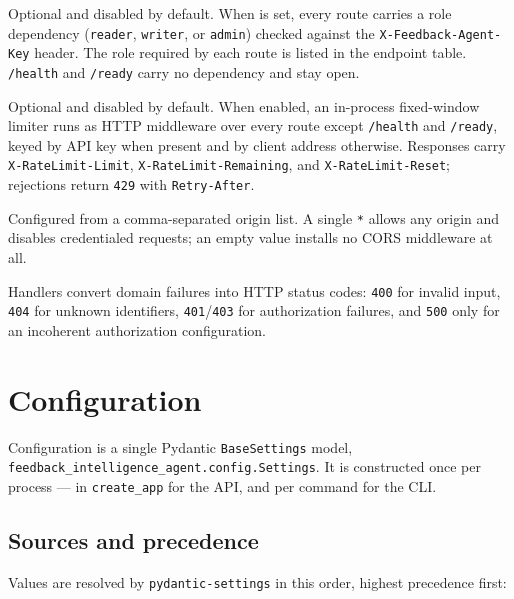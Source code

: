 \begin{description}[nosep]
  \item[Authorization] Optional and disabled by default. When
     is set, every route carries a
    role dependency (\texttt{reader}, \texttt{writer}, or \texttt{admin})
    checked against the \texttt{X-Feedback-Agent-Key} header. The role required
    by each route is listed in the endpoint table. \texttt{/health} and
    \texttt{/ready} carry no dependency and stay open.
  \item[Rate limiting] Optional and disabled by default. When enabled, an
    in-process fixed-window limiter runs as HTTP middleware over every route
    except \texttt{/health} and \texttt{/ready}, keyed by API key when present
    and by client address otherwise. Responses carry
    \texttt{X-RateLimit-Limit}, \texttt{X-RateLimit-Remaining}, and
    \texttt{X-RateLimit-Reset}; rejections return \texttt{429} with
    \texttt{Retry-After}.
  \item[CORS] Configured from a comma-separated origin list. A single
    \texttt{*} allows any origin and disables credentialed requests; an empty
    value installs no CORS middleware at all.
  \item[Error mapping] Handlers convert domain failures into HTTP status
    codes: \texttt{400} for invalid input, \texttt{404} for unknown
    identifiers, \texttt{401}/\texttt{403} for authorization failures, and
    \texttt{500} only for an incoherent authorization configuration.
\end{description}



\chapter{Configuration}
\label{ch:configuration}

Configuration is a single Pydantic \texttt{BaseSettings} model,
\texttt{feedback\_intelligence\_agent.config.Settings}. It is constructed once
per process --- in \texttt{create\_app} for the API, and per command for the
CLI.

\section{Sources and precedence}

Values are resolved by \texttt{pydantic-settings} in this order, highest
precedence first:

